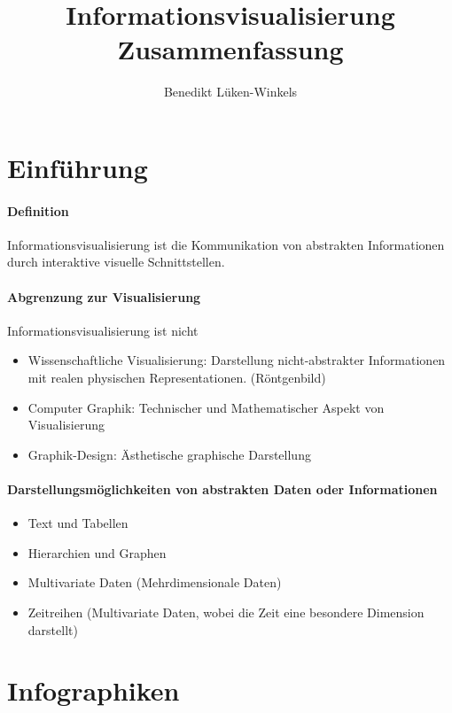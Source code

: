 \documentclass[ngerman]{scrartcl}
\title{Informationsvisualisierung \\ Zusammenfassung}
\author{Benedikt Lüken-Winkels}
\begin{document}
\maketitle
\tableofcontents
\newpage



\section{Einführung}
\paragraph{Definition} Informationsvisualisierung ist die Kommunikation von abstrakten Informationen durch interaktive visuelle Schnittstellen. 

\paragraph{Abgrenzung zur Visualisierung} Informationsvisualisierung ist nicht

\begin{itemize}
  \item Wissenschaftliche Visualisierung: Darstellung nicht-abstrakter Informationen mit realen physischen Representationen. (Röntgenbild)
  \item Computer Graphik: Technischer und Mathematischer Aspekt von Visualisierung
  \item Graphik-Design: Ästhetische graphische Darstellung
\end{itemize}


\paragraph{Darstellungsmöglichkeiten von abstrakten Daten oder Informationen}
\begin{itemize}
  \item Text und Tabellen
  \item Hierarchien und Graphen
  \item Multivariate Daten (Mehrdimensionale Daten)
  \item Zeitreihen (Multivariate Daten, wobei die Zeit eine besondere Dimension darstellt)
\end{itemize}


\section{Infographiken}
\end{document}
